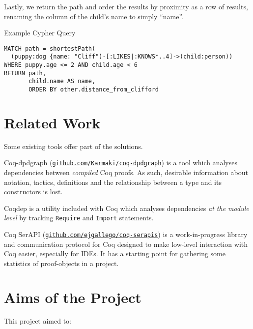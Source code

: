 Lastly, we return the path and order the results by proximity as a row of
results, renaming the column of the child's name to simply ``name''.

\begin{listing}[tb]

  \caption{Example Cypher Query}
  \label{lst:cypherexample}

  \begin{verbatim}
MATCH path = shortestPath(
  (puppy:dog {name: "Cliff")-[:LIKES|:KNOWS*..4]->(child:person))
WHERE puppy.age <= 2 AND child.age < 6
RETURN path,
       child.name AS name,
       ORDER BY other.distance_from_clifford
  \end{verbatim}

\end{listing}

\section{Related Work}

Some existing tools offer part of the solutions.

Coq-dpdgraph
(\href{http://github.com/Karmaki/coq-dpdgraph}{\texttt{github.com/Karmaki/coq-dpdgraph}})
is a tool which analyses dependencies between \emph{compiled} Coq proofs. As
such, desirable information about notation, tactics, definitions and the
relationship between a type and its constructors is lost.

Coqdep is a utility included with Coq which analyses dependencies \emph{at the
module level} by tracking {\tt Require} and {\tt Import} statements.

Coq SerAPI
(\href{http://github.com/ejgallego/coq-serapis}{\texttt{github.com/ejgallego/coq-serapis}})
is a work-in-progress library and communication protocol for Coq designed to
make low-level interaction with Coq easier, especially for IDEs. It has a
starting point for gathering some statistics of proof-objects in a project.

\section{Aims of the Project}
\label{intro:aims}

This project aimed to:

